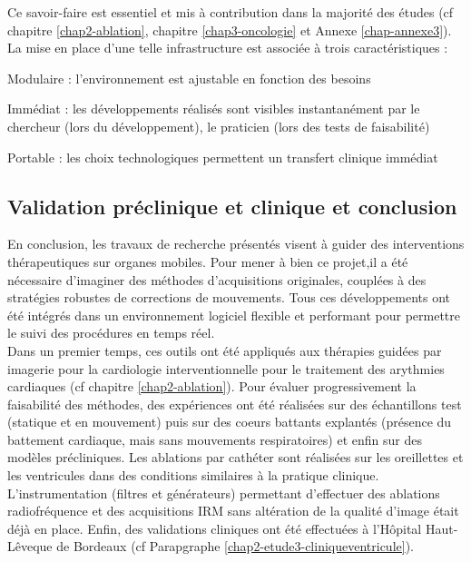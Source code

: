 \documentclass[10pt,a4paper]{report}
\begin{document}
Ce savoir-faire est essentiel et mis à contribution dans la majorité des études (cf chapitre \ref{chap2-ablation}, chapitre \ref{chap3-oncologie} et Annexe \ref{chap-annexe3}). La mise en place d’une telle infrastructure est associée à trois caractéristiques :
\begin{description}
\item Modulaire : l’environnement est ajustable en fonction des besoins
\item Immédiat : les développements réalisés sont visibles instantanément par le chercheur (lors du
développement), le praticien (lors des tests de faisabilité)
\item Portable : les choix technologiques permettent un transfert clinique immédiat
\end{description}

\subsection{Validation préclinique et clinique et conclusion}
\label{chap4-conclusion}

En conclusion, les travaux de recherche présentés visent à guider des interventions thérapeutiques sur organes mobiles. Pour mener à bien ce projet,il a été nécessaire d’imaginer des méthodes d’acquisitions originales, couplées à des stratégies robustes de corrections de mouvements. Tous ces développements ont été intégrés dans un environnement logiciel flexible et performant pour permettre le suivi des procédures en temps réel.\\

Dans un premier temps, ces outils ont été appliqués aux thérapies guidées par imagerie pour la cardiologie interventionnelle pour le traitement des arythmies cardiaques (cf chapitre \ref{chap2-ablation}). Pour évaluer progressivement la faisabilité des méthodes, des expériences ont été réalisées sur des échantillons test (statique et en mouvement) puis sur des coeurs battants explantés (présence du battement cardiaque, mais sans mouvements respiratoires) et enfin sur des modèles précliniques. Les ablations par cathéter sont réalisées sur les oreillettes et les ventricules dans des conditions similaires à la pratique clinique. L’instrumentation (filtres et générateurs) permettant d’effectuer des ablations radiofréquence et des acquisitions IRM sans altération de la qualité d’image était déjà en place. Enfin, des validations cliniques ont été effectuées à l’Hôpital Haut-Lêveque de Bordeaux (cf Parapgraphe \ref{chap2-etude3-cliniqueventricule}).\\

\renewcommand{\bibname}{References}


\end{document}
